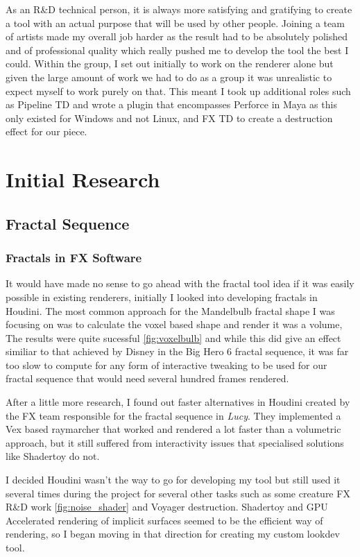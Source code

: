 \documentclass[11pt,a4paper,final,notitlepage]{report}
\begin{document}
As an R\&D technical person, it is always more satisfying and gratifying to create a tool with an actual purpose that will be used by other people. Joining a team of artists made my overall job harder as the result had to be absolutely polished and of professional quality which really pushed me to develop the tool the best I could. Within the group, I set out initially to work on the renderer alone but given the large amount of work we had to do as a group it was unrealistic to expect myself to work purely on that. This meant I took up additional roles such as Pipeline TD and wrote a plugin that encompasses Perforce in Maya as this only existed for Windows and not Linux, and FX TD to create a destruction effect for our piece.

\chapter{Initial Research}

\section{Fractal Sequence}
\subsection{Fractals in FX Software}

It would have made no sense to go ahead with the fractal tool idea if it was easily possible in existing renderers, initially I looked into developing fractals in Houdini. The most common approach for the Mandelbulb  fractal shape I was focusing on was to calculate the voxel based shape and render it was a volume, The results were quite sucessful \ref{fig:voxelbulb} and while this did give an effect similiar to that achieved by Disney in the Big Hero 6 \cite{bh6} fractal sequence, it was far too slow to compute for any form of interactive tweaking to be used for our fractal sequence that would need several hundred frames rendered. 

After a little more research, I found out faster alternatives in Houdini created by the FX team responsible for the fractal sequence in \textit{Lucy}. They implemented a Vex based raymarcher \cite{Kim:2014:CIU:2614106.2614166} that worked and rendered a lot  faster than a volumetric approach, but it still suffered from interactivity issues that specialised solutions like Shadertoy do not. 

I decided Houdini wasn't the way to go for developing my tool but still used it several times during the project for several other tasks such as some creature FX R\&D work  \ref{fig:noise_shader} and Voyager destruction. Shadertoy and GPU Accelerated rendering of implicit surfaces seemed to be the efficient way of rendering, so I began moving in that direction for creating my custom lookdev tool.
\end{document}
